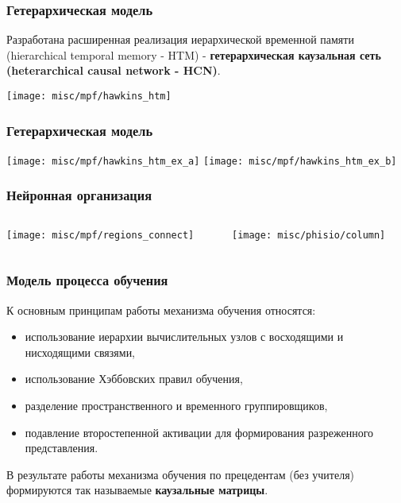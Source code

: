 \documentclass[default]{beamer}
\begin{document}
	
	\begin{frame}
		\frametitle{Гетерархическая модель}
		
		Разработана расширенная реализация иерархической временной памяти (hierarchical temporal memory - HTM) - \textbf{гетерархическая каузальная сеть (heterarchical causal network - HCN)}.
		
		\begin{center}
			\texttt{[image: misc/mpf/hawkins\_htm]}
		\end{center}

	\end{frame}

	\begin{frame}
		\frametitle{Гетерархическая модель}

		\begin{center}
			\texttt{[image: misc/mpf/hawkins\_htm\_ex\_a]}
			\texttt{[image: misc/mpf/hawkins\_htm\_ex\_b]}
		\end{center}
		\nocite{*}
		\printbibliography[keyword={hetermem}, resetnumbers=true]
	\end{frame}
		
	\begin{frame}
		\frametitle{Нейронная организация}
		
		\begin{columns}
			\begin{column}{0.65\textwidth}
				\texttt{[image: misc/mpf/regions\_connect]}
			\end{column}
			\begin{column}{0.35\textwidth}
				\texttt{[image: misc/phisio/column]}
			\end{column}
		\end{columns}
		\nocite{*}
		\printbibliography[keyword={simplehtm}, resetnumbers=true]
	\end{frame}
	
	\begin{frame}
		\frametitle{Модель процесса обучения}
		
		К основным принципам работы механизма обучения относятся: 
		
		\begin{itemize}
			\item использование иерархии вычислительных узлов с восходящими и нисходящими связями, 
			\item использование Хэббовских правил обучения, 
			\item разделение пространственного и временного группировщиков, 
			\item подавление второстепенной активации для формирования разреженного представления.
		\end{itemize}
		
		В результате работы механизма обучения по прецедентам (без учителя) формируются так называемые \textbf{каузальные матрицы}.
		\vfill
		\nocite{*}
		\printbibliography[keyword={htmlearn}, resetnumbers=true]
	\end{frame}	
\end{document}
